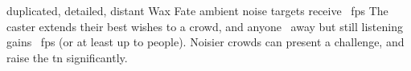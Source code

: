   {duplicated, detailed, distant}%
  {Wax}%
  {Fate}%
  {ambient noise}%
  {targets receive \showDam~\glspl{fp}}%
  {
    The caster extends their best wishes to a crowd, and anyone \spellRange\ away but still listening gains \showDam~\glspl{fp} (or at least up to  people).
    Noisier crowds can present a challenge, and raise the \gls{tn} significantly.
  }

